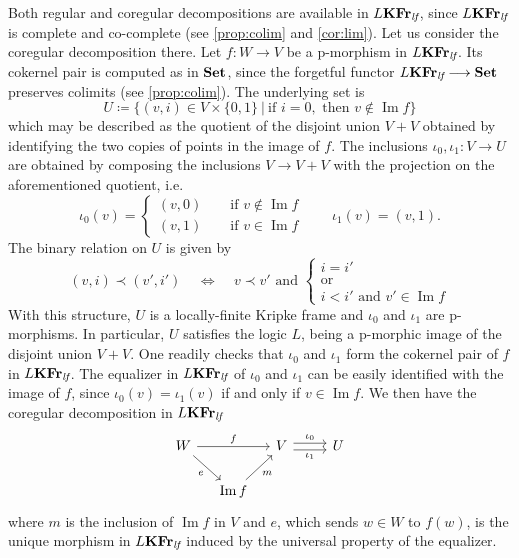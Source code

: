 \documentclass{article}
\theoremstyle{definition}
\DeclareMathOperator{\Image}{Im}
\newcommand{\KFr}{\textup{\textbf{KFr}}}
\newcommand{\lf}{\textit{lf}}
\newcommand{\Set}{\textup{\textbf{Set}}}
\begin{document}
Both regular and coregular decompositions are available in $L\KFr_\lf$, since $L\KFr_\lf$ is complete and co-complete (see \cref{prop:colim} and \cref{cor:lim}). Let us consider the coregular decomposition there. Let $f \colon W \longrightarrow V$ be a p-morphism in $L\KFr_\lf$. %
Its cokernel pair is computed as in $\Set$, since the forgetful functor $L\KFr_\lf \longrightarrow \Set$ preserves colimits (see \cref{prop:colim}). The underlying set is
$$U \coloneqq \{(v,i) \in V \times \{0,1\}\ \vert\ \text{if } i = 0, \text{ then } v \notin \Image f\}$$
which may be described as the quotient of the disjoint union $V + V$ obtained by identifying the two copies of points in the image of $f$. The inclusions $\iota_0, \iota_1 \colon V \longrightarrow U$ are obtained by composing the inclusions $V \longrightarrow V + V$ with the projection on the aforementioned quotient, i.e.\
\[
\iota_0(v) =
\begin{cases}
(v,0) \qquad \text{if } v \notin \Image f\\
(v,1) \qquad \text{if } v \in \Image f
\end{cases}
\qquad
\iota_1(v) = (v,1).
\]
The binary relation on $U$ is given by
$$(v,i) \prec (v',i') ~~~~~\iff~~~~~ v \prec v' \text{ and }
\begin{cases}
i = i'\\
\text{or}\\
i<i' \text{ and } v' \in \Image f
\end{cases}$$
With this structure, $U$ is a locally-finite Kripke frame and $\iota_0$ and $\iota_1$ are p-morphisms. In particular, $U$ satisfies the logic $L$, being a p-morphic image of the disjoint union $V + V$. One readily checks that $\iota_0$ and $\iota_1$ form the cokernel pair of $f$ in $L\KFr_\lf$. The equalizer in $L\KFr_\lf$ of $\iota_0$ and $\iota_1$ can be easily identified with the image of $f$, since $\iota_0(v) = \iota_1(v)$ if and only if $v \in \Image f$. We then have the coregular decomposition in $L\KFr_\lf$
\[\begin{tikzcd}[ampersand replacement=\&,column sep=small]
	W \&\& V \&\& U \\
	\& {\Image f}
	\arrow["f", from=1-1, to=1-3]
	\arrow["e"', from=1-1, to=2-2]
	\arrow["{\iota_1}"', shift right, from=1-3, to=1-5]
	\arrow["{\iota_0}", shift left, from=1-3, to=1-5]
	\arrow["m"', from=2-2, to=1-3]
\end{tikzcd}\]
where $m$ is the inclusion of $\Image f$ in $V$ and $e$, which sends $w \in W$ to $f(w)$, is the unique morphism in $L\KFr_\lf$ induced by the universal property of the equalizer.
\end{document}
